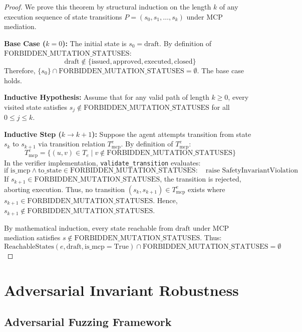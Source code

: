 \documentclass[10pt,conference,letterpaper]{article}
\begin{document}
\begin{proof}
We prove this theorem by structural induction on the length $k$ of any execution sequence of state transitions $P = (s_0, s_1, \dots, s_k)$ under MCP mediation.

\textbf{Base Case ($k = 0$):} The initial state is $s_0 = \text{draft}$. By definition of $\text{FORBIDDEN\_MUTATION\_STATUSES}$:
$$\text{draft} \notin \{\text{issued}, \text{approved}, \text{executed}, \text{closed}\}$$
Therefore, $\{s_0\} \cap \text{FORBIDDEN\_MUTATION\_STATUSES} = \emptyset$. The base case holds.

\textbf{Inductive Hypothesis:} Assume that for any valid path of length $k \ge 0$, every visited state satisfies $s_j \notin \text{FORBIDDEN\_MUTATION\_STATUSES}$ for all $0 \le j \le k$.

\textbf{Inductive Step ($k \to k + 1$):} Suppose the agent attempts transition from state $s_k$ to $s_{k+1}$ via transition relation $T_{\text{mcp}}^e$. By definition of $T_{\text{mcp}}^e$:
$$T_{\text{mcp}}^e = \{ (u, v) \in T_e \mid v \notin \text{FORBIDDEN\_MUTATION\_STATUSES} \}$$
In the verifier implementation, \texttt{validate\_transition} evaluates:
$$\text{if } \text{is\_mcp} \land \text{to\_state} \in \text{FORBIDDEN\_MUTATION\_STATUSES}: \quad \text{raise SafetyInvariantViolation}$$
If $s_{k+1} \in \text{FORBIDDEN\_MUTATION\_STATUSES}$, the transition is rejected, aborting execution. Thus, no transition $(s_k, s_{k+1}) \in T_{\text{mcp}}^e$ exists where $s_{k+1} \in \text{FORBIDDEN\_MUTATION\_STATUSES}$. Hence, $s_{k+1} \notin \text{FORBIDDEN\_MUTATION\_STATUSES}$.

By mathematical induction, every state reachable from $\text{draft}$ under MCP mediation satisfies $s \notin \text{FORBIDDEN\_MUTATION\_STATUSES}$. Thus:
$$\text{ReachableStates}(e, \text{draft}, \text{is\_mcp}=\text{True}) \cap \text{FORBIDDEN\_MUTATION\_STATUSES} = \emptyset$$
\end{proof}

\section{Adversarial Invariant Robustness}

\subsection{Adversarial Fuzzing Framework}
\end{document}
